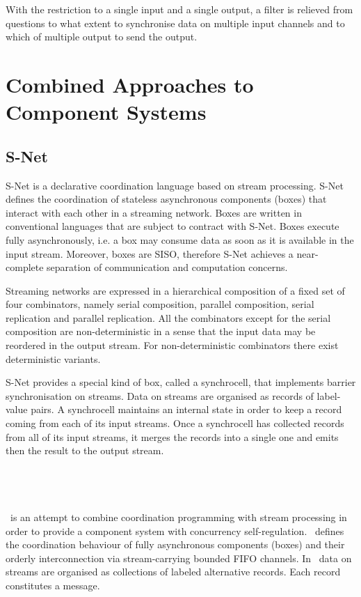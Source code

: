 With the restriction to a single input and a single output, a filter is relieved from questions to what extent to synchronise data on multiple input channels and to which of multiple output to send the output.


\section{Combined Approaches to Component Systems}

    \subsection{S-Net}
S-Net \cite{snet_intro} is a declarative coordination language based on stream processing. S-Net defines the coordination of stateless asynchronous components (boxes) that interact with each other in a streaming network. Boxes are written in conventional languages that are subject to contract with S-Net. Boxes execute fully asynchronously, i.e. a box may consume data as soon as it is available in the input stream. Moreover, boxes are SISO, therefore S-Net achieves a near-complete separation of communication and computation concerns.

Streaming networks are expressed in a hierarchical composition of a fixed set of four combinators, namely serial composition, parallel composition, serial replication and parallel replication. All the combinators except for the serial composition are non-deterministic in a sense that the input data may be reordered in the output stream. For non-deterministic combinators there exist deterministic variants.

S-Net provides a special kind of box, called a synchrocell, that implements barrier synchronisation on streams. Data on streams are organised as records of label-value pairs. A synchrocell maintains an internal state in order to keep a record coming from each of its input streams. Once a synchrocell has collected records from all of its input streams, it merges the records into a single one and emits then the result to the output stream.


    \subsection{\ak\ }
\ak\ is an attempt to combine coordination programming with stream processing in order to provide a component system with concurrency self-regulation. \ak\ defines the coordination behaviour of fully asynchronous components (boxes) and their orderly interconnection via stream-carrying bounded FIFO channels. In \ak\, data on streams are organised as collections of labeled alternative records. Each record constitutes a message.

